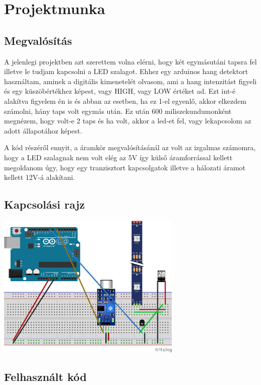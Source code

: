 \documentclass[a4paper,11pt]{article}
\begin{document}
\pagebreak

\section{Projektmunka}

\subsection{Megvalósítás}

A jelenlegi projektben azt szerettem volna elérni, hogy két egymásutáni tapsra fel illetve le tudjam kapcsolni a LED szalagot. Ehhez egy arduinos hang detektort használtam, aminek a digitális kimenetelét olvasom, ami a hang intenzitást figyeli és egy küszöbértékhez képest, vagy HIGH, vagy LOW értéket ad. Ezt int-é alakítva figyelem én is és abban az esetben, ha ez 1-el egyenlő, akkor elkezdem számolni, hány taps volt egymás után. Ez után 600 miliszekundumonként megnézem, hogy volt-e 2 taps és ha volt, akkor a led-et fel, vagy lekapcsolom az adott állapotához képest. 

A kód részéről ennyit, a áramkör megvalósításánál az volt az izgalmas számomra, hogy a LED szalagnak nem volt elég az 5V így külső áramforrással kellett megoldanom úgy, hogy egy tranzisztort kapcsolgatok illetve a hálozati áramot kellett 12V-á alakítani.

\subsection{Kapcsolási rajz}

\begin{center}
\includegraphics[width=0.66\textwidth]{Clapping_lamp_fritzing_bb.jpg}
\end{center}

\pagebreak

\subsection{Felhasznált kód}
\end{document}

